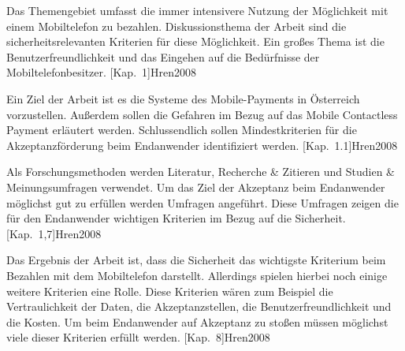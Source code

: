 
 Das Themengebiet umfasst die immer intensivere Nutzung der Möglichkeit mit einem Mobiltelefon
zu bezahlen. Diskussionsthema der Arbeit sind die sicherheitsrelevanten Kriterien für diese Möglichkeit. Ein großes Thema
ist die Benutzerfreundlichkeit und das Eingehen auf die Bedürfnisse der Mobiltelefonbesitzer. [Kap.~1]{Hren2008}

 Ein Ziel der Arbeit ist es die Systeme des Mobile-Payments in Österreich vorzustellen. Außerdem
sollen die Gefahren im Bezug auf das Mobile Contactless Payment erläutert werden. Schlussendlich sollen Mindestkriterien
für die Akzeptanzförderung beim Endanwender identifiziert werden. [Kap.~1.1]{Hren2008}

 Als Forschungsmethoden werden Literatur, Recherche & Zitieren und Studien & Meinungsumfragen
verwendet. Um das Ziel der Akzeptanz beim Endanwender möglichst gut zu erfüllen werden Umfragen angeführt. Diese Umfragen
zeigen die für den Endanwender wichtigen Kriterien im Bezug auf die Sicherheit. [Kap.~1,7]{Hren2008}

 Das Ergebnis der Arbeit ist, dass die Sicherheit das wichtigste Kriterium beim Bezahlen mit dem 
Mobiltelefon darstellt. Allerdings spielen hierbei noch einige weitere Kriterien eine Rolle. Diese Kriterien wären zum
Beispiel die Vertraulichkeit der Daten, die Akzeptanzstellen, die Benutzerfreundlichkeit und die Kosten. Um beim 
Endanwender auf Akzeptanz zu stoßen müssen möglichst viele dieser Kriterien erfüllt werden. [Kap.~8]{Hren2008}


